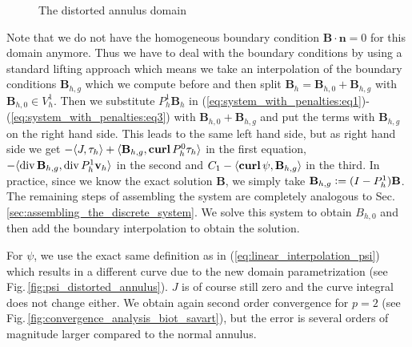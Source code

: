 \documentclass[../master_thesis.tex]{subfiles}
\begin{document}
\begin{figure}
    \centering
    \caption{The distorted annulus domain}
    \label{fig:distorted_annulus_domain}
\end{figure}


Note that we do not have 
the homogeneous boundary condition
$\mathbf{B}\cdot \mathbf{n} = 0$ for this domain anymore. Thus we have to deal with the boundary conditions 
by using a standard lifting approach which means we take an interpolation of the boundary conditions 
$\mathbf{B}_{h,g}$ which we compute before and then split
$\mathbf{B}_{h} = \mathbf{B}_{h,0} + \mathbf{B}_{h,g}$ with $\mathbf{B}_{h,0}\in V_h^1$.
Then we substitute $P_h^1 \mathbf{B}_h$ in 
(\ref{eq:system_with_penalties:eq1})-(\ref{eq:system_with_penalties:eq3}) 
with $\mathbf{B}_{h,0} + \mathbf{B}_{h,g}$ and put the terms with  
$\mathbf{B}_{h,g}$ on the right hand side. 
This leads to the same left hand side, but as right hand side we get
$-\langle J, \tau_h \rangle + \langle \mathbf{B}_{h,g}, \veccurl P_h^0 \tau_h \rangle$ in 
the first equation, $-\langle\operatorname{div}  \mathbf{B}_{h,g} ,\operatorname{div} P_h^1\mathbf{v}_{h} \rangle$
in the second and $C_1 - \langle\veccurl \psi,\mathbf{B}_{h,g} \rangle$ 
in the third. In practice, since we know the exact solution $\mathbf{B}$, we simply take 
$\mathbf{B}_{h,g} \vcentcolon= (I-P^1_h)\mathbf{B}$. The remaining steps of assembling 
the system are completely analogous to Sec.\,\ref{sec:assembling_the_discrete_system}. 
We solve this system to obtain $B_{h,0}$ and then add the boundary 
interpolation to obtain the solution.

For $\psi$, we use the exact same definition as in (\ref{eq:linear_interpolation_psi}) 
which results in a different 
curve due to the new domain parametrization (see Fig.\,\ref{fig:psi_distorted_annulus}). $J$ is of course
still zero and the curve integral does not change either. We obtain again 
second order convergence for $p=2$ (see Fig.\,\ref{fig:convergence_analysis_biot_savart}), 
but the error is several orders of magnitude larger compared to the normal annulus. 
\end{document}
